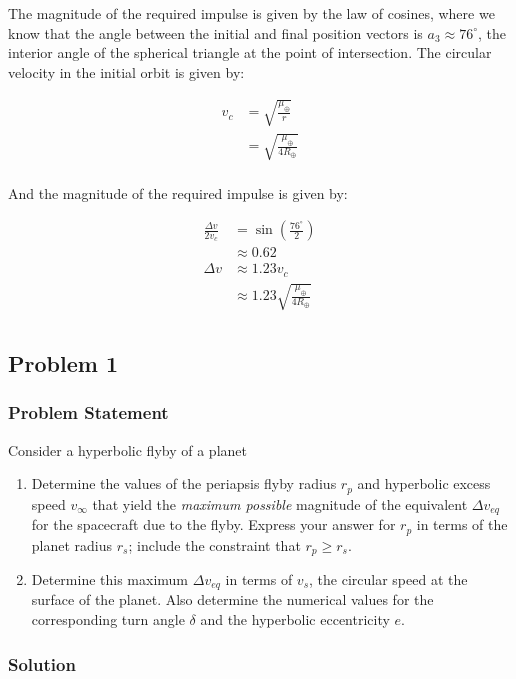 The magnitude of the required impulse is given by the law of cosines, where we know that the angle between the initial and final position vectors is $a_3 \approx 76^\circ$, the interior angle of the spherical triangle at the point of intersection. The circular velocity in the initial orbit is given by:

\begin{align*}
    v_c &= \sqrt{\frac{\mu_\oplus}{r}} \\
    &= \sqrt{\frac{\mu_\oplus}{4R_\oplus}} \\
\end{align*}

And the magnitude of the required impulse is given by:

\begin{align*}
    \frac{\Delta v}{2 v_c} &= \sin\left( \frac{76^\circ}{2} \right) \\
    &\approx 0.62 \\
    \Delta v &\approx 1.23 v_c \\
    &\approx 1.23 \sqrt{\frac{\mu_\oplus}{4R_\oplus}} \\
\end{align*}

\subsection{Problem 1}

\subsubsection{Problem Statement}
Consider a hyperbolic flyby of a planet

\begin{enumerate}
    \item Determine the values of the periapsis flyby radius $r_p$ and hyperbolic excess speed $v_\infty$ that yield the \textit{maximum possible} magnitude of the equivalent $\Delta v_{eq}$ for the spacecraft due to the flyby. Express your answer for $r_p$ in terms of the planet radius $r_s$; include the constraint that $r_p \geq r_s$.
    \item Determine this maximum $\Delta v_{eq}$ in terms of $v_s$, the circular speed at the surface of the planet. Also determine the numerical values for the corresponding turn angle $\delta$ and the hyperbolic eccentricity $e$.
\end{enumerate}

\subsubsection{Solution}

